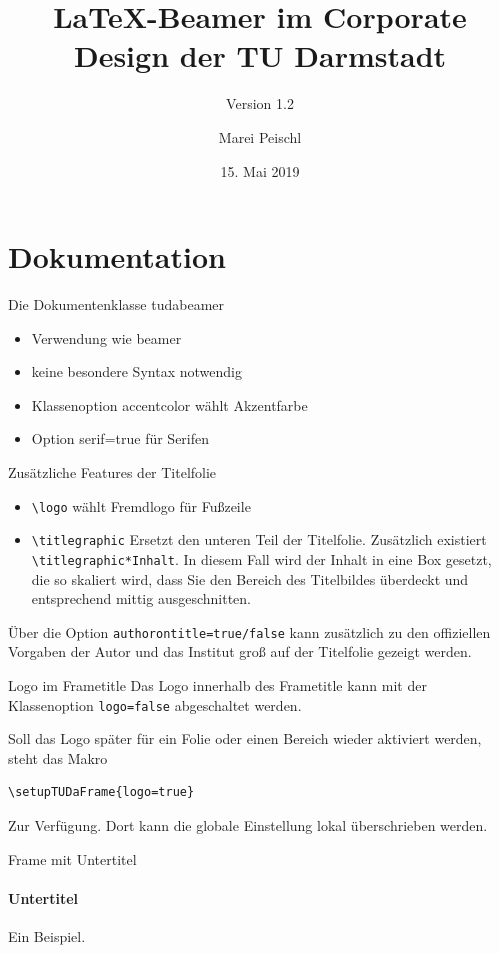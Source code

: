 \documentclass[
	ngerman,%
	aspectratio=169,%
	color={accentcolor=2d},
	logo=false,%
	colorframetitle=true,%
	]{tudabeamer}
\title{LaTeX-Beamer im Corporate Design der TU Darmstadt}
\subtitle{Version 1.2}
\author[M. Peischl]{Marei Peischl}
\institute{pei\TeX}
\date{15. Mai 2019}
\let\code\texttt
\begin{document}
\maketitle

\section{Dokumentation}
\begin{frame}{Die Dokumentenklasse tudabeamer}
\begin{itemize}
	\item Verwendung wie beamer
	\item keine besondere Syntax notwendig
	\item Klassenoption accentcolor wählt Akzentfarbe
	\item Option serif=true für Serifen	
\end{itemize}
\end{frame}

\begin{frame}{Zusätzliche Features der Titelfolie}
\begin{itemize}
	\item \code{\textbackslash{}logo} wählt Fremdlogo für Fußzeile
	\item \code{\textbackslash{}titlegraphic} Ersetzt den unteren Teil der Titelfolie. Zusätzlich existiert \code{\textbackslash{}titlegraphic*{Inhalt}}.
	In diesem Fall wird der Inhalt in eine Box gesetzt, die so skaliert wird, dass Sie den Bereich des Titelbildes überdeckt und entsprechend mittig ausgeschnitten.
\end{itemize}
	Über die Option \code{authorontitle=true/false} kann zusätzlich zu den offiziellen Vorgaben der Autor und das Institut groß auf der Titelfolie gezeigt werden.
\end{frame}

\begin{frame}[fragile]{Logo im Frametitle}
Das Logo innerhalb des Frametitle kann mit der Klassenoption \code{logo=false} abgeschaltet werden.

Soll das Logo später für ein Folie oder einen Bereich wieder aktiviert werden, steht das Makro
\begin{verbatim}
\setupTUDaFrame{logo=true}
\end{verbatim}
Zur Verfügung. Dort kann die globale Einstellung lokal überschrieben werden.
\end{frame}

\begin{frame}{Frame mit Untertitel}
\framesubtitle{Untertitel}
Ein Beispiel.
\end{frame}
\end{document}
